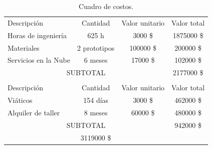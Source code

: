 \documentclass[
11pt, %
]{charter}
\begin{document}
\begin{table}[htpb]
\centering
\begin{tabularx}{\linewidth}{@{}|X|c|r|r|@{}}
\hline
\rowcolor[HTML]{C0C0C0} 
\multicolumn{4}{|c|}{\cellcolor[HTML]{C0C0C0}COSTOS DIRECTOS} \\ \hline
\rowcolor[HTML]{C0C0C0} 
Descripción &
  \multicolumn{1}{c|}{\cellcolor[HTML]{C0C0C0}Cantidad} &
  \multicolumn{1}{c|}{\cellcolor[HTML]{C0C0C0}Valor unitario} &
  \multicolumn{1}{c|}{\cellcolor[HTML]{C0C0C0}Valor total} \\ \hline
  
  \multicolumn{1}{|l|}{Horas de ingeniería}  &
  \multicolumn{1}{c|}{625 h} &
  \multicolumn{1}{c|}{3000 \$} &
  \multicolumn{1}{c|}{1875000 \$} \\ \hline
 
 \multicolumn{1}{|l|}{Materiales}  &
  \multicolumn{1}{c|}{2 prototipos} &
  \multicolumn{1}{c|}{100000 \$} &
  \multicolumn{1}{c|}{200000 \$} \\ \hline
  
  \multicolumn{1}{|l|}{Servicios en la Nube}  &
  \multicolumn{1}{c|}{6 meses} &
  \multicolumn{1}{c|}{17000 \$} &
  \multicolumn{1}{c|}{102000 \$} \\ \hline

  
\multicolumn{3}{|c|}{SUBTOTAL} &
  \multicolumn{1}{c|}{2177000 \$} \\ \hline
\rowcolor[HTML]{C0C0C0} 
\multicolumn{4}{|c|}{\cellcolor[HTML]{C0C0C0}COSTOS INDIRECTOS} \\ \hline
\rowcolor[HTML]{C0C0C0} 
Descripción &
  \multicolumn{1}{c|}{\cellcolor[HTML]{C0C0C0}Cantidad} &
  \multicolumn{1}{c|}{\cellcolor[HTML]{C0C0C0}Valor unitario} &
  \multicolumn{1}{c|}{\cellcolor[HTML]{C0C0C0}Valor total} \\ \hline


\multicolumn{1}{|l|}{Viáticos}  &
  \multicolumn{1}{c|}{154 días} &
  \multicolumn{1}{c|}{3000 \$} &
  \multicolumn{1}{c|}{462000 \$} \\ \hline
  
\multicolumn{1}{|l|}{Alquiler de taller}  &
 \multicolumn{1}{c|}{8 meses} &
  \multicolumn{1}{c|}{60000 \$} &
  \multicolumn{1}{c|}{480000 \$} \\ \hline
  
\multicolumn{3}{|c|}{SUBTOTAL} &
  \multicolumn{1}{c|}{942000 \$} \\ \hline
\rowcolor[HTML]{C0C0C0}
\multicolumn{3}{|c|}{TOTAL} &
\multicolumn{1}{c|}{3119000 \$} 
   \\ \hline
\end{tabularx}%
\caption{Cuadro de costos.}
\label{tab:costos}
\end{table}
\end{document}
